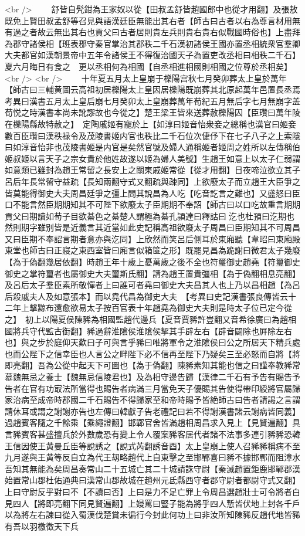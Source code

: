 <br />
　　舒皆自髠鉗為王家奴以從【田叔孟舒皆趙國郎中也從才用翻】及張敖既免上賢田叔孟舒等召見與語漢廷臣無能出其右者【師古曰古者以右為尊言材用無有過之者故云無出其右也貢父曰古者居則貴左兵則貴右貴右似戰國時俗也】上盡拜為郡守諸侯相【班表郡守秦官掌治其郡秩二千石漢初諸侯王國亦置丞相統衆官羣卿大夫都官如漢朝景帝中五年令諸侯王不得復治國天子為置吏改丞相曰相秩二千石】　夏六月晦日有食之　更以丞相何為相國【自丞相進相國則相國之位尊於丞相矣】<br />
<br />
　　十年夏五月太上皇崩于櫟陽宫秋七月癸卯葬太上皇於萬年【師古曰三輔黄圖云高祖初居櫟陽太上皇因居櫟陽既崩葬其北原起萬年邑置長丞焉　考異曰漢書五月太上皇后崩七月癸卯太上皇崩葬萬年荀紀五月無后字七月無崩字盖荀悦之時漢書本尚未訛謬故也今從之】楚王梁王皆來送葬赦櫟陽囚【臣瓚曰萬年陵在櫟陽縣故特赦之】　定陶戚姬有寵於上【如淳曰姬音怡衆妾之總稱也漢官曰姬妾數百臣瓚曰漢秩禄令及茂陵書姬内官也秩比二千石位次倢伃下在七子八子之上索隱曰如淳音怡非也茂陵書姬是内官是矣然官號及婦人通稱姬者姬周之姓所以左傳稱伯姬叔姬以言天子之宗女貴於他姓故遂以姬為婦人美號】生趙王如意上以太子仁弱謂如意類已雖封為趙王常留之長安上之關東戚姬常從【從才用翻】日夜啼泣欲立其子呂后年長常留守益疏【長知兩翻守式又翻疏與疎同】上欲廢太子而立趙王大臣爭之皆莫能得御史大夫周昌廷爭之彊上問其說昌為人吃【吃音訖言之難也】又盛怒曰臣口不能言然臣期期知其不可陛下欲廢太子臣期期不奉詔【師古曰以口吃故重言期期貢父曰期讀如荀子目欲綦色之綦楚人謂極為綦孔頴達曰釋詁曰汔也杜預曰汔期也然則期字雖别皆是近義言其近當如此史記稱高祖欲廢太子周昌曰臣期知其不可周昌又曰臣期不奉詔言期者意亦與汔同】上欣然而笑呂后側耳於東廂聽【韋昭曰東廂殿東堂也師古曰正寢之東西室皆曰廂言似箱箧之形】既罷見昌為跪謝曰微君太子幾廢【為于偽翻幾居依翻】時趙王年十歲上憂萬歲之後不全也符璽御史趙堯【符璽御史御史之掌符璽者也屬御史大夫璽斯氏翻】請為趙王置貴彊相【為于偽翻相息亮翻】及呂后太子羣臣素所敬憚者上曰誰可者堯曰御史大夫昌其人也上乃以昌相趙【為呂后殺戚夫人及如意張本】而以堯代昌為御史大夫　【考異曰史記漢書張良傳皆云十二年上擊黥布還愈欲易太子按百官表十年趙堯為御史大夫則是時太子位已定今從之】　初上以陽夏侯陳豨為相國監趙代邊兵【夏音賈豨許豈翻又音希徐廣曰為趙相國將兵守代監古衘翻】豨過辭淮隂侯淮隂侯挈其手辟左右【辟音闢除也屛除左右也】與之步於庭仰天歎曰子可與言乎豨曰唯將軍令之淮隂侯曰公之所居天下精兵處也而公陛下之信幸臣也人言公之畔陛下必不信再至陛下乃疑矣三至必怒而自將【將即亮翻】吾為公從中起天下可圖也【為于偽翻】陳豨素知其能也信之曰謹奉教豨常慕魏無忌之養士【魏無忌信陵君也】及為相守邊告歸【漢律二千石有予告有賜告予告者在官有功㝡法所當得也賜告者病滿三月當免天子優賜其告使得帶印綬將官屬歸家治病至成帝時郡國二千石賜告不得歸家至和帝時賜予皆絶師古曰告者請謁之言謂請休耳或謂之謝謝亦告也左傳曰韓獻子告老禮記曰若不得謝漢書諸云謝病皆同義】過趙賓客隨之千餘乘【乘繩證翻】邯鄲官舍皆滿趙相周昌求入見上【見賢遍翻】具言豨賓客甚盛擅兵於外數歲恐有變上令人覆案豨客居代者諸不法事多連引豨豨恐韓王信因使王黄曼丘臣等說誘之【說式芮翻誘音酉】太上皇崩上使人召豨豨稱病不至九月遂與王黄等反自立為代王刼略趙代上自東擊之至邯鄲喜曰豨不據邯鄲而阻漳水吾知其無能為矣周昌奏常山二十五城亡其二十城請誅守尉【秦滅趙置鉅鹿邯鄲郡漢始置常山郡杜佑通典曰漢常山郡故城在趙州元氐縣西守者郡守尉者都尉守式又翻】上曰守尉反乎對曰不【不讀曰否】上曰是力不足亡罪上令周昌選趙壯士可令將者白見四人【將即亮翻下同見賢遍翻】上嫚罵曰豎子能為將乎四人慙皆伏地上封各千戶以為將左右諫曰從入蜀漢伐楚賞未徧行今封此何功上曰非汝所知陳豨反趙代地皆豨有吾以羽檄徵天下兵